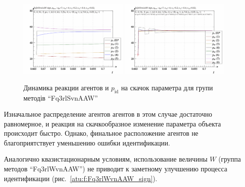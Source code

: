\begin{figure}[htb!]
  \begin{center}
    \includegraphics[width=0.48\textwidth]{p/sign/qls-p_t_pi_m_Fq3rlSvnAAW_sign.png}
    \hfill
    \includegraphics[width=0.48\textwidth]{p/sign/qls-p_t_p_m_Fq3rlSvnAAW_sign.png}
  \end{center}
  \caption{Динамика реакции агентов и $p_\mathrm{id}$ на скачок параметра для групи методів ``Fq3rlSvnAAW''}
  \label{atu:f:Fq3rlSvnAAW_sign}
\end{figure}

Изначальное распределение агентов агентов в этом случае достаточно равномерное,
и реакция на скачкообразное изменение параметра объекта
происходит быстро. Однако, финальное расположение агентов
не благоприятствует уменьшению ошибки идентификации.

Аналогично квазистационарным условиям,
использование величины $W$ (группа методов ``Fq3rlWvnAAW'')
не приводит к заметному улучшению процесса идентификации
(рис.~\ref{atu:f:Fq3rlWvnAAW_sign}).

